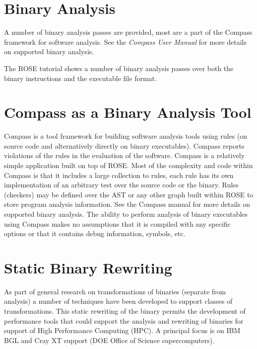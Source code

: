 
\section{Binary Analysis}

   A number of binary analysis passes are provided, most are a part of the Compass
framework for software analysis.  See the {\em Compass User Manual} for more details on
supported binary analysis.

   The ROSE tutorial shows a number of binary analysis passes over both the binary
instructions and the executable file format.

\section{Compass as a Binary Analysis Tool}

   Compass is a tool framework for building software analysis tools using rules (on source
code and alternatively directly on binary executables). Compass
reports violations of the rules in the evaluation of the software.  Compass is a
relatively simple application built on top of ROSE.  Most of the complexity and code 
within Compass is that it includes a large collection to rules, each rule has its
own implementation of an arbitrary test over the source code or the binary.  Rules
(checkers) may be defined over the AST or any other graph built within ROSE to store 
program analysis information. See the Compass manual for more details on supported
binary analysis.  The ability to perform analysis of binary executables using Compass 
makes no assumptions that it is compiled with any specific options or that it contains
debug information, symbols, etc.


\section{Static Binary Rewriting}
   As part of general research on transformations of binaries (separate from analysis)
a number of techniques have been developed to support classes of transformations.
This static rewriting of the binary permits the development of performance tools 
that could support the analysis and rewriting of binaries for support of High 
Performance Computing (HPC). A principal focus is on IBM BGL and Cray XT support 
(DOE Office of Science supercomputers).


